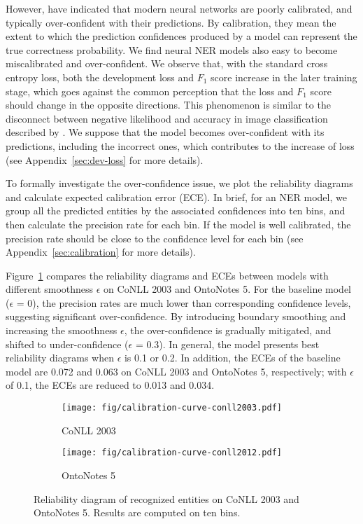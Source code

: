 \documentclass[11pt]{article}
\begin{document}
However, \citet{guo2017calibration} have indicated that modern neural networks are poorly calibrated, and typically over-confident with their predictions. By calibration, they mean the extent to which the prediction confidences produced by a model can represent the true correctness probability. We find neural NER models also easy to become miscalibrated and over-confident. We observe that, with the standard cross entropy loss, both the development loss and $F_1$ score increase in the later training stage, which goes against the common perception that the loss and $F_1$ score should change in the opposite directions. This phenomenon is similar to the disconnect between negative likelihood and accuracy in image classification described by \citet{guo2017calibration}. We suppose that the model becomes over-confident with its predictions, including the incorrect ones, which contributes to the increase of loss (see Appendix~\ref{sec:dev-loss} for more details). 

To formally investigate the over-confidence issue, we plot the reliability diagrams and calculate expected calibration error (ECE). In brief, for an NER model, we group all the predicted entities by the associated confidences into ten bins, and then calculate the precision rate for each bin. If the model is well calibrated, the precision rate should be close to the confidence level for each bin (see Appendix~\ref{sec:calibration} for more details). 

Figure~\ref{fig:calibration} compares the reliability diagrams and ECEs between models with different smoothness $\epsilon$ on CoNLL 2003 and OntoNotes 5. For the baseline model ($\epsilon$ = 0), the precision rates are much lower than corresponding confidence levels, suggesting significant over-confidence. By introducing boundary smoothing and increasing the smoothness $\epsilon$, the over-confidence is gradually mitigated, and shifted to under-confidence ($\epsilon$ = 0.3). In general, the model presents best reliability diagrams when $\epsilon$ is 0.1 or 0.2. In addition, the ECEs of the baseline model are 0.072 and 0.063 on CoNLL 2003 and OntoNotes 5, respectively; with $\epsilon$ of 0.1, the ECEs are reduced to 0.013 and 0.034. 


\begin{figure}[t]
    \centering
    \begin{subfigure}{\columnwidth}
    \centering
    \texttt{[image: fig/calibration-curve-conll2003.pdf]}
    \caption{CoNLL 2003}
    \end{subfigure}
    \begin{subfigure}{\columnwidth}
    \centering
    \texttt{[image: fig/calibration-curve-conll2012.pdf]}
    \caption{OntoNotes 5}
    \end{subfigure}
    \caption{Reliability diagram of recognized entities on CoNLL 2003 and OntoNotes 5. Results are computed on ten bins.}
    \label{fig:calibration}
\end{figure}
\end{document}
